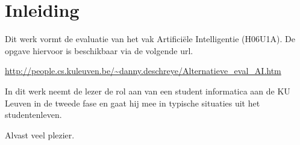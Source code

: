 \documentclass[alternative-exam.tex]{subfiles}
\begin{document}
\chapter*{Inleiding}
Dit werk vormt de evaluatie van het vak Artifici\"ele Intelligentie (H06U1A). De opgave hiervoor is beschikbaar via de volgende url.
\begin{center}
\url{http://people.cs.kuleuven.be/~danny.deschreye/Alternatieve_eval_AI.htm}
\end{center}
In dit werk neemt de lezer de rol aan van een student informatica aan de KU Leuven in de tweede fase en gaat hij mee in typische situaties uit het studentenleven.

\vspace{1cm}
\noindent Alvast veel plezier.
\end{document}
